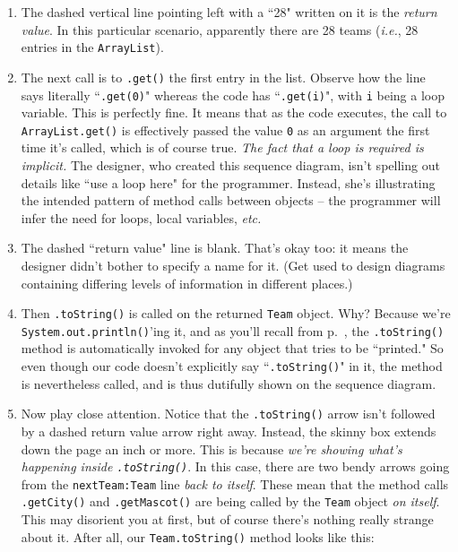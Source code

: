 \begin{enumerate}
\itemsep.1em

\item The dashed vertical line pointing left with a ``28" written on it is the
\textit{return value}. In this particular scenario, apparently there are 28
teams (\textit{i.e.}, 28 entries in the \texttt{ArrayList}).

\item The next call is to \texttt{.get()} the first entry in the list. Observe
how the line says literally ``\texttt{.get(0)}" whereas the code has
``\texttt{.get(i)}", with \texttt{i} being a loop variable. This is perfectly
fine. It means that as the code executes, the call to \texttt{ArrayList.get()}
is effectively passed the value \texttt{0} as an argument the first time it's
called, which is of course true. \textit{The fact that a loop is required is
implicit.} The designer, who created this sequence diagram, isn't spelling out
details like ``use a loop here" for the programmer. Instead, she's
illustrating the intended pattern of method calls between objects -- the
programmer will infer the need for loops, local variables, \textit{etc.}

\item The dashed ``return value" line is blank. That's okay too: it means the
designer didn't bother to specify a name for it. (Get used to design diagrams
containing differing levels of information in different places.)

\item Then \texttt{.toString()} is called on the returned \texttt{Team}
object. Why? Because we're \texttt{System.out.println()}'ing it, and as you'll
recall from p.~\pageref{pg:toString}, the \texttt{.toString()} method is
automatically invoked for any object that tries to be ``printed." So even
though our code doesn't explicitly say ``\texttt{.toString()}" in it, the
method is nevertheless called, and is thus dutifully shown on the sequence
diagram.

\item Now play close attention. Notice that the \texttt{.toString()} arrow
isn't followed by a dashed return value arrow right away. Instead, the skinny
box extends down the page an inch or more. This is because \textit{we're
showing what's happening inside \texttt{.toString()}}. In this case, there are
two bendy arrows going from the \texttt{nextTeam:Team} line \textit{back to
itself}. These mean that the method calls \texttt{.getCity()} and
\texttt{.getMascot()} are being called by the \texttt{Team} object \textit{on
itself}. This may disorient you at first, but of course there's nothing really
strange about it. After all, our \texttt{Team.toString()} method looks like
this:


\end{enumerate}
